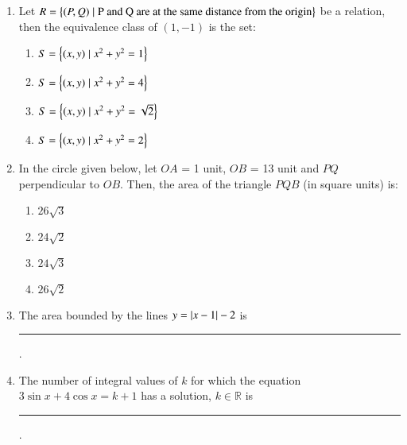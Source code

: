 \documentclass[journal]{IEEEtran}
\begin{document}
\begin{enumerate}
    \item Let $R = \left\{(P,Q) \mid \text{P and Q are at the same distance from the origin}\right\}$
    be a relation, then the equivalence class of $(1,-1)$ is the set:

    \begin{multicols}{2}
    \begin{enumerate}
        \item $S = \left\{(x, y) \mid x^2 + y^2 = 1\right\}$
        \item $S = \left\{(x, y) \mid x^2 + y^2 = 4\right\}$
        \item $S = \left\{(x, y) \mid x^2 + y^2 = \sqrt{2}\right\}$
        \item $S = \left\{(x, y) \mid x^2 + y^2 = 2\right\}$
    \end{enumerate}
    \end{multicols}

    \item In the circle given below, let $OA$ = 1 unit,
    $OB$ = 13 unit and $PQ$ perpendicular to $OB$. Then, the area
    of the triangle $PQB$ (in square units) is:

    \begin{center}
    \end{center} 


    \begin{multicols}{4}
    \begin{enumerate}
        \item $26 \sqrt{3}$
        \item $24 \sqrt{2}$
        \item $24 \sqrt{3}$
        \item $26 \sqrt{2}$
    \end{enumerate}
    \end{multicols}
    
    \item The area bounded by the lines $y = \left\vert x - 1\right\vert - 2$ is \rule{1cm}{0.15mm}.
    
    \item The number of integral values of $k$ for which the equation
    $3\sin x + 4\cos x = k + 1$ has a solution, $k \in \mathbb{R}$ is \rule{1cm}{0.15mm}.


\end{enumerate}
\end{document}
